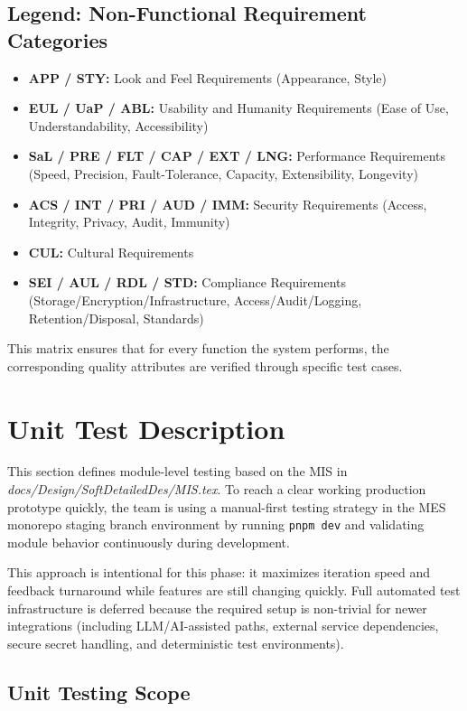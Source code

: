 \documentclass[12pt, titlepage]{article}
\begin{document}
\subsection*{Legend: Non-Functional Requirement Categories}
\begin{itemize}
    \item \textbf{APP / STY:} Look and Feel Requirements (Appearance, Style)
    \item \textbf{EUL / UaP / ABL:} Usability and Humanity Requirements (Ease of Use, Understandability, Accessibility)
    \item \textbf{SaL / PRE / FLT / CAP / EXT / LNG:} Performance Requirements (Speed, Precision, Fault-Tolerance, Capacity, Extensibility, Longevity)
    \item \textbf{ACS / INT / PRI / AUD / IMM:} Security Requirements (Access, Integrity, Privacy, Audit, Immunity)
    \item \textbf{CUL:} Cultural Requirements
    \item \textbf{SEI / AUL / RDL / STD:} Compliance Requirements (Storage/Encryption/Infrastructure, Access/Audit/Logging, Retention/Disposal, Standards)
\end{itemize}

\noindent This matrix ensures that for every function the system performs, the corresponding quality attributes are verified through specific test cases.

\section{Unit Test Description}

This section defines module-level testing based on the MIS in
\textit{docs/Design/SoftDetailedDes/MIS.tex}. To reach a clear working production
prototype quickly, the team is using a manual-first testing strategy in the MES
monorepo staging branch environment by running \texttt{pnpm dev} and validating
module behavior continuously during development.

This approach is intentional for this phase: it maximizes iteration speed and
feedback turnaround while features are still changing quickly. Full automated
test infrastructure is deferred because the required setup is non-trivial for
newer integrations (including LLM/AI-assisted paths, external service
dependencies, secure secret handling, and deterministic test environments).

\subsection{Unit Testing Scope}
\end{document}
